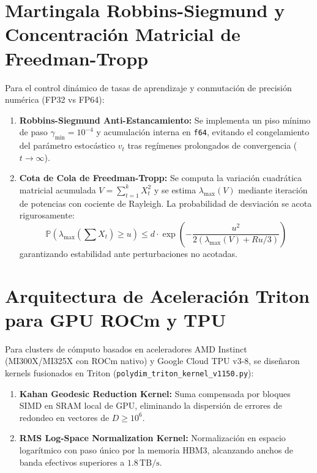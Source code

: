 \section{Martingala Robbins-Siegmund y Concentración Matricial de Freedman-Tropp}
Para el control dinámico de tasas de aprendizaje y conmutación de precisión numérica (FP32 vs FP64):
\begin{enumerate}
    \item \textbf{Robbins-Siegmund Anti-Estancamiento:} Se implementa un piso mínimo de paso $\gamma_{\min} = 10^{-4}$ y acumulación interna en \texttt{f64}, evitando el congelamiento del parámetro estocástico $v_t$ tras regímenes prolongados de convergencia ($t \to \infty$).
    \item \textbf{Cota de Cola de Freedman-Tropp:} Se computa la variación cuadrática matricial acumulada $V = \sum_{t=1}^k X_t^2$ y se estima $\lambda_{\max}(V)$ mediante iteración de potencias con cociente de Rayleigh. La probabilidad de desviación se acota rigurosamente:
    \begin{equation}
    \mathbb{P}\left( \lambda_{\max}\left(\sum X_t\right) \ge u \right) \le d \cdot \exp\left( -\frac{u^2}{2(\lambda_{\max}(V) + R u / 3)} \right)
    \end{equation}
    garantizando estabilidad ante perturbaciones no acotadas.
\end{enumerate}

\section{Arquitectura de Aceleración Triton para GPU ROCm y TPU}
Para clusters de cómputo basados en aceleradores AMD Instinct (MI300X/MI325X con ROCm nativo) y Google Cloud TPU v3-8, se diseñaron kernels fusionados en Triton (\texttt{polydim\_triton\_kernel\_v1150.py}):
\begin{enumerate}
    \item \textbf{Kahan Geodesic Reduction Kernel:} Suma compensada por bloques SIMD en SRAM local de GPU, eliminando la dispersión de errores de redondeo en vectores de $D \ge 10^6$.
    \item \textbf{RMS Log-Space Normalization Kernel:} Normalización en espacio logarítmico con paso único por la memoria HBM3, alcanzando anchos de banda efectivos superiores a $1.8\,\text{TB/s}$.
\end{enumerate}
